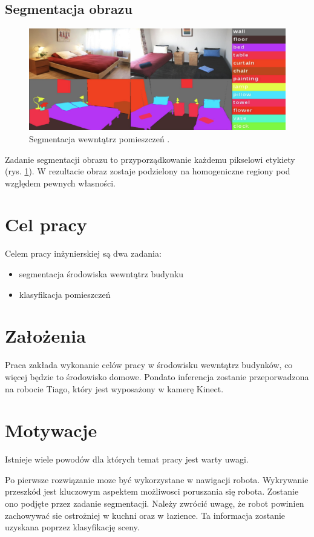 \subsection{Segmentacja obrazu}
\begin{figure}
    \includegraphics[width=\textwidth]{images/segment.png}
    \caption{Segmentacja wewntątrz pomieszczeń \cite{zhang2018context}.}
    \label{fig:segment}
  \end{figure}

Zadanie segmentacji obrazu to przyporządkowanie każdemu pikselowi etykiety (rys. \ref{fig:segment}). W rezultacie obraz zostaje podzielony na homogeniczne regiony pod względem pewnych własności.

\section{Cel pracy}
Celem pracy inżynierskiej są dwa zadania:
\begin{itemize}
    \item segmentacja środowiska wewntątrz budynku
    \item klasyfikacja pomieszczeń
\end{itemize}
\section{Założenia}
Praca zakłada wykonanie celów pracy w środowisku wewntątrz budynków, co więcej będzie to środowisko domowe. Pondato inferencja zostanie przeporwadzona na robocie Tiago, który jest wyposażony w kamerę Kinect.
\section{Motywacje}
Istnieje wiele powodów dla których temat pracy jest warty uwagi.

Po pierwsze rozwiązanie moze być wykorzystane w nawigacji robota. Wykrywanie przeszkód jest kluczowym aspektem możliwosci poruszania się robota. Zostanie ono podjęte przez zadanie segmentacji. Należy zwrócić uwagę, że robot powinien zachowywać sie ostrożniej w kuchni oraz w łazience. Ta informacja zostanie uzyskana poprzez klasyfikację sceny.

